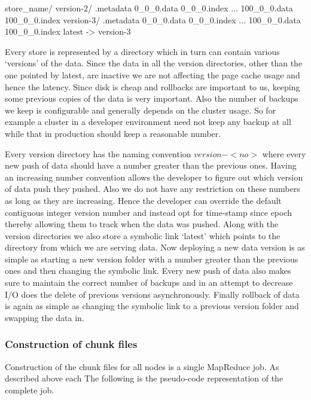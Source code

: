 \documentclass[10pt,twocolumn,preprint,natbib,authoryear]{sigplanconf}
\begin{document}
\scriptsize
\begin{verbatimtab}
store_name/
  version-2/
    .metadata
    0_0_0.data
    0_0_0.index
    ...
    100_0_0.data
    100_0_0.index
  version-3/
    .metadata
    0_0_0.data
    0_0_0.index
    ...
    100_0_0.data
    100_0_0.index
  latest -> version-3
\end{verbatimtab}
\normalsize

Every store is represented by a directory which in turn can contain various `versions' of the data. Since the data in all the version directories, other than the one pointed by latest, are inactive we are not affecting the page cache usage and hence the latency. Since disk is cheap and rollbacks are important to us, keeping some previous copies of the data is very important. Also the number of backups we keep is configurable and generally depends on the cluster usage. So for example a cluster in a developer environment need not keep any backup at all while that in production should keep a reasonable number.

Every version directory has the naming convention $version-<no>$ where every new push of data should have a number greater than the previous ones. Having an increasing number convention allows the developer to figure out which version of data push they pushed. Also we do not have any restriction on these numbers as long as they are increasing. Hence the developer can override the default contiguous integer version number and instead opt for time-stamp since epoch thereby allowing them to track when the data was pushed. Along with the version directories we also store a symbolic link `latest' which points to the directory from which we are serving data. Now deploying a new data version is as simple as starting a new version folder with a number greater than the previous ones and then changing the symbolic link. Every new push of data also makes sure to maintain the correct number of backups and in an attempt to decrease I/O does the delete of previous versions asynchronously. Finally rollback of data is again as simple as changing the symbolic link to a previous version folder and swapping the data in. 


\subsubsection{Construction of chunk files}

Construction of the chunk files for all nodes is a single MapReduce job. As described above each The following is the pseudo-code representation of the complete job. 
\end{document}
